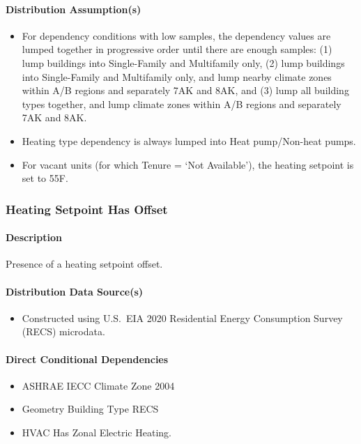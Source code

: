 \paragraph{Distribution Assumption(s)}
\begin{itemize}
    \item For dependency conditions with low samples, the dependency values are lumped together in progressive order until there are enough samples: (1) lump buildings into Single-Family and Multifamily only, (2) lump buildings into Single-Family and Multifamily only, and lump nearby climate zones within A/B regions and separately 7AK and 8AK, and (3) lump all building types together, and lump climate zones within A/B regions and separately 7AK and 8AK.
    \item Heating type dependency is always lumped into Heat pump/Non-heat pumps.
    \item For vacant units (for which Tenure = ‘Not Available’), the heating setpoint is set to 55\degree F.
\end{itemize}


\subsubsection{Heating Setpoint Has Offset}
\paragraph{Description}
Presence of a heating setpoint offset.

\paragraph{Distribution Data Source(s)}
\begin{itemize}
    \item Constructed using U.S.~EIA 2020 Residential Energy Consumption Survey (RECS) microdata.
\end{itemize}

\paragraph{Direct Conditional Dependencies}
\begin{itemize}
    \item ASHRAE IECC Climate Zone 2004
    \item Geometry Building Type RECS
    \item HVAC Has Zonal Electric Heating.
\end{itemize}

